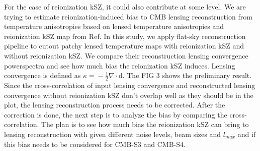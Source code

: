 \documentclass[12pt, notitlepage, onecolumn, amsmath, amssymb, aps]{revtex4-1}
\begin{document}
For the case of reionization kSZ, it could also contribute at some level. We are trying to estimate reionization-induced bias to CMB lensing reconstruction from temperature anisotropies based on lensed temperature anisotropies\cite{Stein:2020its} and reionization kSZ map from Ref\cite{Alvarez:2015xzu}. In this study, we apply flat-sky reconstruction pipeline to cutout patchy lensed temperature maps with reionization kSZ and without reionization kSZ. We compare their reconstruction lensing convergence powerspectra and see how much bias the reionization kSZ induces. Lensing convergence is defined as \(\kappa \mathrm=-\frac{1}{2} \nabla \cdot \mathrm{d}\). The FIG 3 shows the preliminary result. Since the cross-correlation of input lensing convergence and reconstructed lensing convergence without reionization kSZ don't overlap well as they should be in the plot, the lensing reconstruction process needs to be corrected. After the correction is done, the next step is to analyze the bias by comparing the cross-correlation. The plan is to see how much bias the reionization kSZ can bring to lensing reconstruction with given different noise levels, beam sizes and \(l_{max}\) and if this bias needs to be considered for CMB-S3 and CMB-S4.










\end{document}
